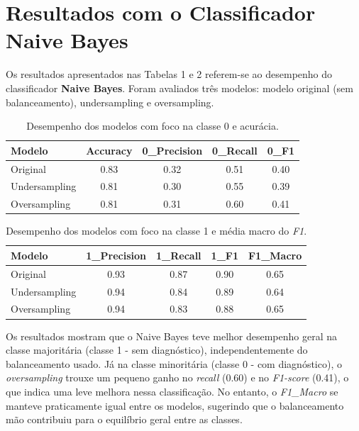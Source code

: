 \documentclass{article}
\begin{document}
\section*{Resultados com o Classificador Naive Bayes}


Os resultados apresentados nas Tabelas 1 e 2 referem-se ao desempenho do classificador \textbf{Naive Bayes}. Foram avaliados três modelos: modelo original (sem balanceamento), undersampling e oversampling.

\begin{table}[H]
\centering
\begin{tabular}{lcccc}
\toprule
\textbf{Modelo} & \textbf{Accuracy} & \textbf{0\_Precision} & \textbf{0\_Recall} & \textbf{0\_F1} \\
\midrule
Original       & 0.83 & 0.32 & 0.51 & 0.40 \\
Undersampling  & 0.81 & 0.30 & 0.55 & 0.39 \\
Oversampling   & 0.81 & 0.31 & 0.60 & 0.41 \\
\bottomrule
\end{tabular}
\caption{Desempenho dos modelos com foco na classe 0 e acurácia.}
\end{table}

\begin{table}[H]
\centering
\begin{tabular}{lcccc}
\toprule
\textbf{Modelo} & \textbf{1\_Precision} & \textbf{1\_Recall} & \textbf{1\_F1} & \textbf{F1\_Macro} \\
\midrule
Original       & 0.93 & 0.87 & 0.90 & 0.65 \\
Undersampling  & 0.94 & 0.84 & 0.89 & 0.64 \\
Oversampling   & 0.94 & 0.83 & 0.88 & 0.65 \\
\bottomrule
\end{tabular}
\caption{Desempenho dos modelos com foco na classe 1 e média macro do \textit{F1}.}
\end{table}

Os resultados mostram que o Naive Bayes teve melhor desempenho geral na classe majoritária (classe 1 - sem diagnóstico), independentemente do balanceamento usado. Já na classe minoritária (classe 0 - com diagnóstico), o \textit{oversampling} trouxe um pequeno ganho no \textit{recall} (0.60) e no \textit{F1-score} (0.41), o que indica uma leve melhora nessa classificação. No entanto, o \textit{F1\_Macro} se manteve praticamente igual entre os modelos, sugerindo que o balanceamento mão contribuiu para o equilíbrio geral entre as classes.
\end{document}
